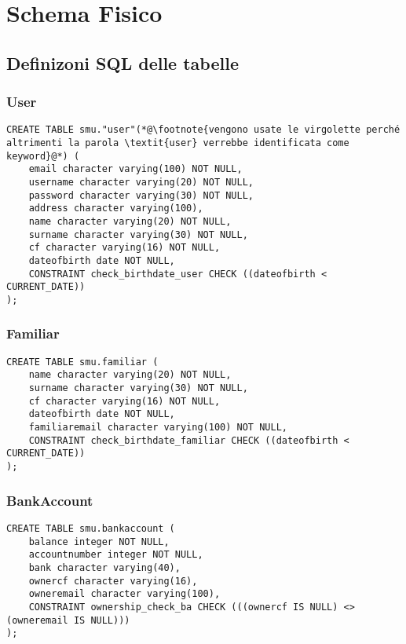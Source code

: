\chapter{Schema Fisico}

\section{Definizoni SQL delle tabelle}

\subsection{User}

\begin{lstlisting}
CREATE TABLE smu."user"(*@\footnote{vengono usate le virgolette perché altrimenti la parola \textit{user} verrebbe identificata come keyword}@*) (
    email character varying(100) NOT NULL,
    username character varying(20) NOT NULL,
    password character varying(30) NOT NULL,
    address character varying(100),
    name character varying(20) NOT NULL,
    surname character varying(30) NOT NULL,
    cf character varying(16) NOT NULL,
    dateofbirth date NOT NULL,
    CONSTRAINT check_birthdate_user CHECK ((dateofbirth < CURRENT_DATE))
);    
\end{lstlisting}

\subsection{Familiar}

\begin{lstlisting}
CREATE TABLE smu.familiar (
    name character varying(20) NOT NULL,
    surname character varying(30) NOT NULL,
    cf character varying(16) NOT NULL,
    dateofbirth date NOT NULL,
    familiaremail character varying(100) NOT NULL,
    CONSTRAINT check_birthdate_familiar CHECK ((dateofbirth < CURRENT_DATE))
);  
\end{lstlisting}

\newpage

\subsection{BankAccount}

\begin{lstlisting}
CREATE TABLE smu.bankaccount (
    balance integer NOT NULL,
    accountnumber integer NOT NULL,
    bank character varying(40),
    ownercf character varying(16),
    owneremail character varying(100),
    CONSTRAINT ownership_check_ba CHECK (((ownercf IS NULL) <> (owneremail IS NULL)))
);  
\end{lstlisting}

